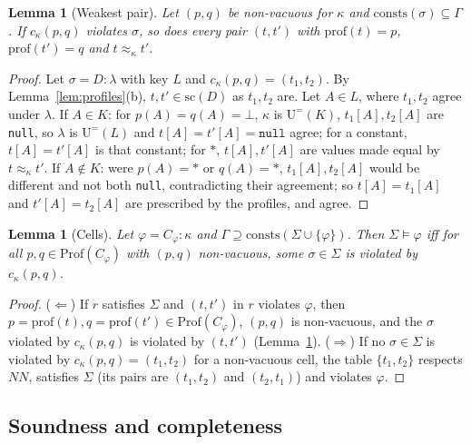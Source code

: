 \documentclass[conference]{IEEEtran}
\newtheorem{lemma}[theorem]{Lemma}
\theoremstyle{definition}
\newcommand{\nul}{\texttt{null}}
\newcommand{\NN}{\mathit{NN}}
\newcommand{\Sig}{\Sigma}
\newcommand{\Ueq}[1]{\mathrm{U}^{=}(#1)}
\newcommand{\scope}{\mathrm{sc}}
\newcommand{\prof}{\mathrm{prof}}
\newcommand{\Prof}{\mathrm{Prof}}
\newcommand{\consts}{\mathrm{consts}}
\newcommand{\ag}{\approx}
\begin{document}
\begin{lemma}[Weakest pair]\label{lem:weakest}
Let $(p,q)$ be non-vacuous for $\kappa$ and $\consts(\sigma)\subseteq\Gamma$. If $c_\kappa(p,q)$
violates $\sigma$, so does every pair $(t,t')$ with $\prof(t)=p$, $\prof(t')=q$ and $t\ag_\kappa t'$.
\end{lemma}

\begin{proof}
Let $\sigma=D:\lambda$ with key $L$ and $c_\kappa(p,q)=(t_1,t_2)$. By
Lemma~\ref{lem:profiles}(b), $t,t'\in\scope(D)$ as $t_1,t_2$ are. Let $A\in L$, where $t_1,t_2$
agree under $\lambda$. If $A\in K$: for $p(A)=q(A)=\bot$, $\kappa$ is $\Ueq{K}$, $t_1[A],t_2[A]$ are
\nul, so $\lambda$ is $\Ueq{L}$ and $t[A]=t'[A]=\nul$ agree; for a constant, $t[A]=t'[A]$ is that
constant; for $*$, $t[A],t'[A]$ are values made equal by $t\ag_\kappa t'$. If $A\notin K$: were
$p(A)=*$ or $q(A)=*$, $t_1[A],t_2[A]$ would be different and not both \nul, contradicting their
agreement; so $t[A]=t_1[A]$ and $t'[A]=t_2[A]$ are prescribed by the profiles, and agree.
\end{proof}

\begin{lemma}[Cells]\label{lem:cells}
Let $\varphi=C_\varphi:\kappa$ and $\Gamma\supseteq\consts(\Sig\cup\{\varphi\})$. Then $\Sig\models\varphi$
iff for all $p,q\in\Prof(C_\varphi)$ with $(p,q)$ non-vacuous, some $\sigma\in\Sig$ is violated by
$c_\kappa(p,q)$.
\end{lemma}

\begin{proof}
($\Leftarrow$) If $r$ satisfies $\Sig$ and $(t,t')$ in $r$ violates $\varphi$, then
$p=\prof(t),q=\prof(t')\in\Prof(C_\varphi)$, $(p,q)$ is non-vacuous, and the $\sigma$ violated by
$c_\kappa(p,q)$ is violated by $(t,t')$ (Lemma~\ref{lem:weakest}). ($\Rightarrow$) If no
$\sigma\in\Sig$ is violated by $c_\kappa(p,q)=(t_1,t_2)$ for a non-vacuous cell, the table
$\{t_1,t_2\}$ respects $\NN$, satisfies $\Sig$ (its pairs are $(t_1,t_2)$ and $(t_2,t_1)$) and violates
$\varphi$.
\end{proof}

\subsection{Soundness and completeness}
\end{document}
